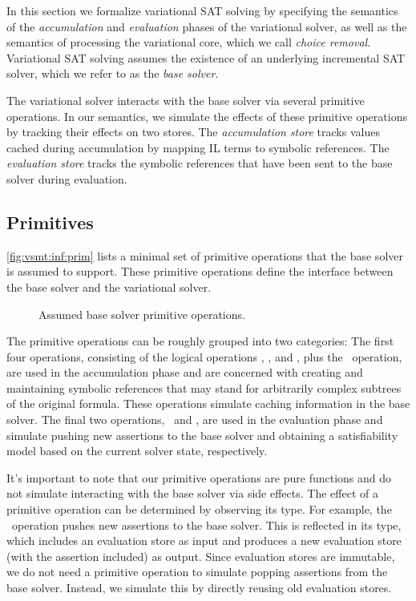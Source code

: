 %
In this section we formalize variational SAT solving by specifying the
semantics of the \emph{accumulation} and \emph{evaluation} phases of the
variational solver, as well as the semantics of processing the variational
core, which we call \emph{choice removal}.
%
Variational SAT solving assumes the existence of an underlying incremental SAT
solver, which we refer to as the \emph{base solver}.


The variational solver interacts with the base solver via several primitive
operations. In our semantics, we simulate the effects of these primitive
operations by tracking their effects on two stores.
%
The \emph{accumulation store} \aStore{} tracks values cached during
accumulation by mapping IL terms to symbolic references. The \emph{evaluation
store} \eStore{} tracks the symbolic references that have been sent to the base
solver during evaluation.

\subsection{Primitives}
%
\autoref{fig:vsmt:inf:prim} lists a minimal set of primitive operations that
the base solver is assumed to support. These primitive operations define the
interface between the base solver and the variational solver.


\begin{figure}
  
  \caption{Assumed base solver primitive operations.}%
  \label{fig:vsmt:inf:prim}
\end{figure}


The primitive operations can be roughly grouped into two categories:
%
The first four operations, consisting of the logical operations \pnot, \pand,
and \por, plus the \pspawn\ operation, are used in the accumulation phase and
are concerned with creating and maintaining symbolic references that may stand
for arbitrarily complex subtrees of the original formula. These operations
simulate caching information in the base solver.
%
The final two operations, \passert\ and \pmodel, are used in the evaluation
phase and simulate pushing new assertions to the base solver and obtaining a
satisfiability model based on the current solver state, respectively.


It's important to note that our primitive operations are pure functions and do
not simulate interacting with the base solver via side effects. The effect of a
primitive operation can be determined by observing its type. For example, the
\passert\ operation pushes new assertions to the base solver. This is reflected
in its type, which includes an evaluation store as input and produces a new
evaluation store (with the assertion included) as output.
%
Since evaluation stores are immutable, we do not need a primitive operation to
simulate popping assertions from the base solver. Instead, we simulate this by
directly reusing old evaluation stores.


